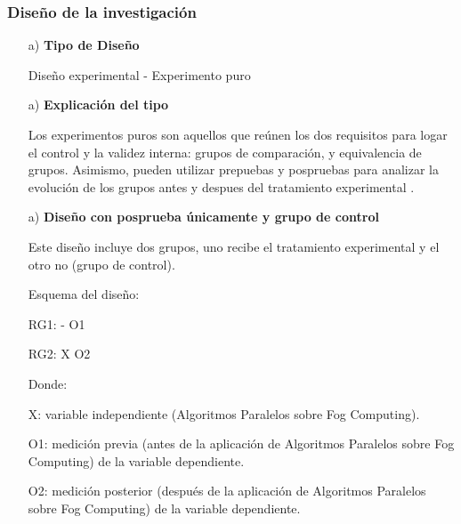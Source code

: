             \subsubsection{Diseño de la investigación}
                \begin{enumerate}
                    \item[a)]{\bf Tipo de Diseño}\par
                        Diseño experimental - Experimento puro 
                    \item[a)]{\bf Explicación del tipo}\par
                        Los experimentos puros son aquellos que reúnen los dos requisitos para logar el control y la validez interna: grupos de comparación, y equivalencia de grupos. Asimismo, pueden utilizar prepuebas y pospruebas para analizar la evolución de los grupos antes y despues del tratamiento experimental {\cite{sampieri1997}}. 
                    \item[a)]{\bf Diseño con posprueba únicamente y grupo de control}\par
                        Este diseño incluye dos grupos, uno recibe el tratamiento experimental y el otro no (grupo  de control).\par
                        Esquema del diseño:\par
                        \begin{center}
                            { RG1: - { }O1}\par
                            { RG2: X O2}\par
                        \end{center} 
                        Donde:\par 
                        X: variable independiente (Algoritmos Paralelos sobre Fog Computing).\par
                        O1: medición previa (antes de la aplicación de Algoritmos Paralelos sobre Fog Computing) de la variable dependiente.\par
                        O2: medición posterior (después de la aplicación de Algoritmos Paralelos sobre Fog Computing) de la variable dependiente.\par
                \end{enumerate}  
